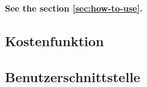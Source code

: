 \chapter{}
\label{sec:Kostenmodell}

\textbf{See the section \ref{sec:how-to-use}.}

\section{Kostenfunktion}

\section{Benutzerschnittstelle}


